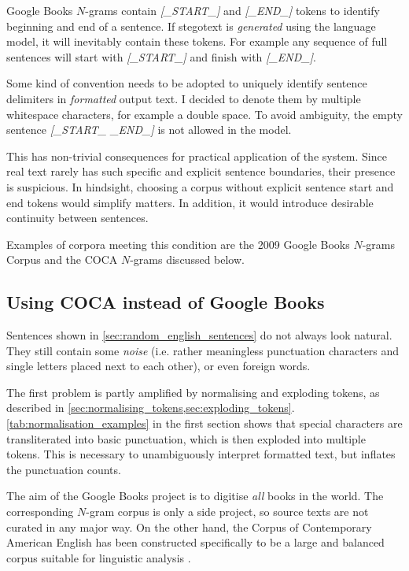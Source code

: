 \documentclass[draft]{IIBproject}
\makeatletter
\DeclareRobustCommand*{\ie}{i.e.\@\xspace}
\DeclareRobustCommand{\ngram}[1]{\emph{[#1]}}
\makeatother
\begin{document}
Google Books $N$-grams contain \ngram{\_START\_} and \ngram{\_END\_} tokens to identify beginning and end of a sentence. If stegotext is \emph{generated} using the language model, it will inevitably contain these tokens. For example any sequence of full sentences will start with \ngram{\_START\_} and finish with \ngram{\_END\_}.

Some kind of convention needs to be adopted to uniquely identify sentence delimiters in \emph{formatted} output text. I decided to denote them by multiple whitespace characters, for example a double space. To avoid ambiguity, the empty sentence \ngram{\_START\_ \_END\_} is not allowed in the model.

This has non-trivial consequences for practical application of the system. Since real text rarely has such specific and explicit sentence boundaries, their presence is suspicious. In hindsight, choosing a corpus without explicit sentence start and end tokens would simplify matters. In addition, it would introduce desirable continuity between sentences.

Examples of corpora meeting this condition are the 2009 Google Books $N$-grams Corpus and the COCA $N$-grams discussed below.

\subsection{Using COCA instead of Google Books}

Sentences shown in \cref{sec:random_english_sentences} do not always look natural. They still contain some \emph{noise} (\ie rather meaningless punctuation characters and single letters placed next to each other), or even foreign words.

The first problem is partly amplified by normalising and exploding tokens, as described in \cref{sec:normalising_tokens,sec:exploding_tokens}. \cref{tab:normalisation_examples} in the first section shows that special characters are transliterated into basic punctuation, which is then exploded into multiple tokens. This is necessary to unambiguously interpret formatted text, but inflates the punctuation counts.

The aim of the Google Books project is to digitise \emph{all} books in the world. The corresponding $N$-gram corpus is only a side project, so source texts are not curated in any major way. On the other hand, the Corpus of Contemporary American English has been constructed specifically to be a large and balanced corpus suitable for linguistic analysis \cite{coca2010}.
\end{document}
